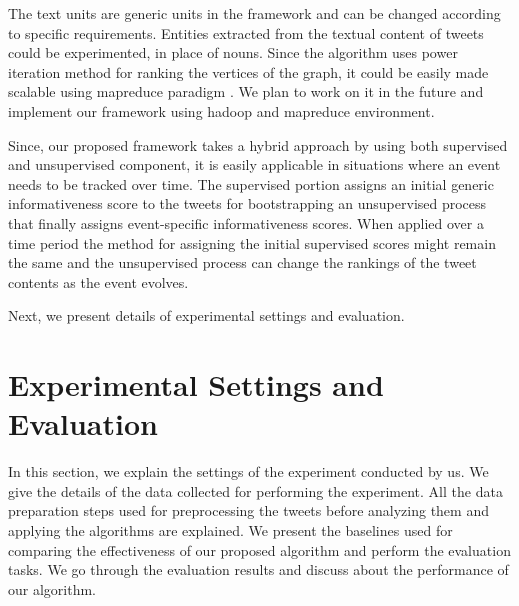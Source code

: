 The text units are generic units in the framework and can be changed according to specific requirements. Entities extracted from the textual content of tweets could be experimented, in place of nouns. Since the algorithm uses power iteration method for ranking the vertices of the graph, it could be easily made scalable using mapreduce paradigm \cite{lin2010design}. We plan to work on it in the future and implement our framework using hadoop and mapreduce environment. 

Since, our proposed framework takes a hybrid approach by using both supervised and unsupervised component, it is easily applicable in situations where an event needs to be tracked over time. The supervised portion assigns an initial generic informativeness score to the tweets for bootstrapping an unsupervised process that finally assigns event-specific informativeness scores. When applied over a time period the method for assigning the initial supervised scores might remain the same and the unsupervised process can change the rankings of the tweet contents as the event evolves. 

Next, we present details of experimental settings and evaluation.
  



\section{Experimental Settings and Evaluation\label{experimentalSettingsAndEvaluation}}
In this section, we explain the settings of the experiment conducted by us. We give the details of the data collected for performing the experiment. All the data preparation steps used for preprocessing the tweets before analyzing them and applying the algorithms are explained. We present the baselines used for comparing the effectiveness of our proposed algorithm and perform the evaluation tasks. We go through the evaluation results and discuss about the performance of our algorithm. 


